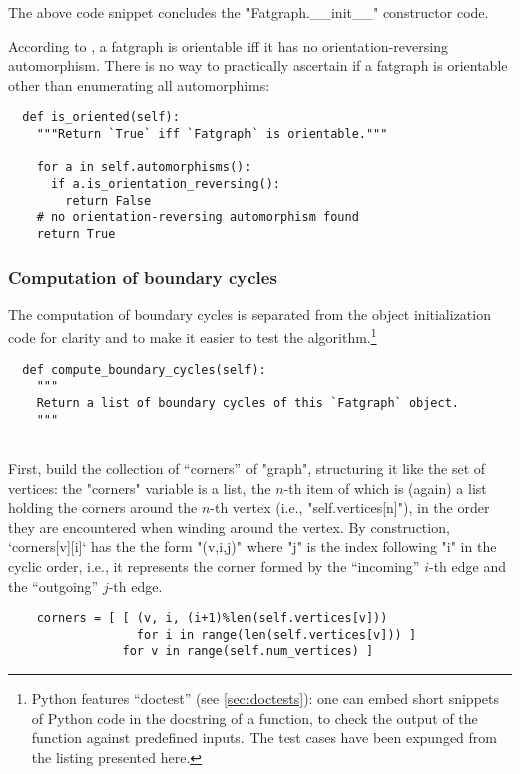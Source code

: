 The above code snippet concludes the "Fatgraph.__init__" constructor
code.

According to , a fatgraph is orientable iff it
has no orientation-reversing automorphism.  There is no
way to practically ascertain if a fatgraph is orientable other than
enumerating all automorphims:
\begin{lstlisting}
  def is_oriented(self):
    """Return `True` iff `Fatgraph` is orientable."""

    for a in self.automorphisms():
      if a.is_orientation_reversing():
        return False
    # no orientation-reversing automorphism found
    return True

\end{lstlisting}


\subsubsection{Computation of boundary cycles}
\label{sec:compute-boundary-cycles}

The computation of boundary cycles is separated from the object
initialization code for clarity and to make it easier to test the
algorithm.\footnote{Python features ``doctest'' (see
  \ref{sec:doctests}): one can embed short snippets of Python code in
  the docstring of a function, to check the output of the function
  against predefined inputs.  The test cases have been expunged from
  the listing presented here.}
\begin{lstlisting}
  def compute_boundary_cycles(self):
    """
    Return a list of boundary cycles of this `Fatgraph` object.
    """
    
\end{lstlisting}
First, build the collection of ``corners'' of "graph", structuring it
like the set of vertices: the "corners" variable is a list, the $n$-th
item of which is (again) a list holding the corners around the $n$-th
vertex (i.e., "self.vertices[n]"), in the order they are encountered
when winding around the vertex.  By construction, `corners[v][i]` has
the the form "(v,i,j)" where "j" is the index following "i" in the
cyclic order, i.e., it represents the corner formed by the
``incoming'' $i$-th edge and the ``outgoing'' $j$-th edge.
\begin{lstlisting}
    corners = [ [ (v, i, (i+1)%len(self.vertices[v]))
                  for i in range(len(self.vertices[v])) ]
                for v in range(self.num_vertices) ]

\end{lstlisting}

